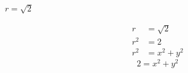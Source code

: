 \begin{problem}[79.]
    $r = \sqrt{2}$
\end{problem}

\begin{solution}
    \begin{align}
        r &= \sqrt{2} \\
        r^2 &= 2 \\
        r^2 &= x^2 + y^2
    \end{align}
    \[\boxed{2 = x^2 + y^2}\]
\end{solution}